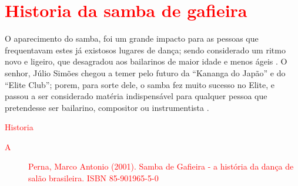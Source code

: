 
\section{\textcolor{red}{Historia da samba de gafieira}}


O aparecimento do samba, 
foi um grande impacto para as pessoas que frequentavam estes já existosos lugares de dança;
sendo considerado um ritmo novo e ligeiro,
que desagradou aos bailarinos de maior idade e menos ágeis \cite[pp. 3]{entrevistajuliojournalbrasil1}.
O senhor, Júlio Simões chegou a temer pelo futuro da ``Kananga do Japão'' e
do ``Elite Club''; porem, para sorte dele, 
o samba fez muito sucesso no Elite,
e passou a ser considerado matéria indispensável para qualquer pessoa que pretendesse ser bailarino, 
compositor ou instrumentista \cite[pp. 3]{entrevistajuliojournalbrasil1}.

\textcolor{red}{Historia
\begin{description}
\item [A] Perna, Marco Antonio (2001). Samba de Gafieira - a história da dança de salão brasileira. ISBN 85-901965-5-0
\end{description}
}
